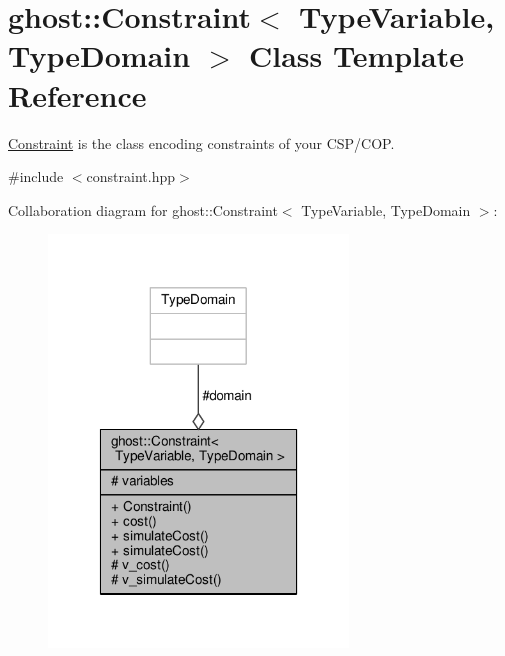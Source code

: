 \hypertarget{classghost_1_1Constraint}{\section{ghost\-:\-:Constraint$<$ Type\-Variable, Type\-Domain $>$ Class Template Reference}
\label{classghost_1_1Constraint}
}


\hyperlink{classghost_1_1Constraint}{Constraint} is the class encoding constraints of your C\-S\-P/\-C\-O\-P.  




{\ttfamily \#include $<$constraint.\-hpp$>$}



Collaboration diagram for ghost\-:\-:Constraint$<$ Type\-Variable, Type\-Domain $>$\-:\nopagebreak
\begin{figure}[H]
\begin{center}
\leavevmode
\includegraphics[width=226pt]{classghost_1_1Constraint__coll__graph}
\end{center}
\end{figure}
